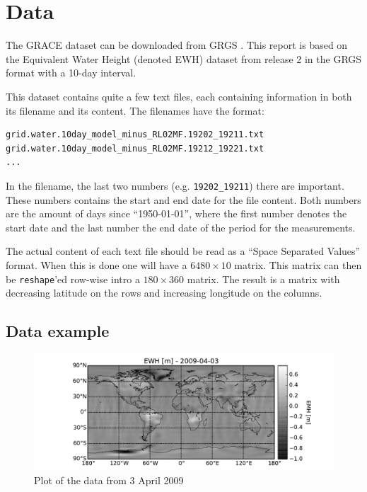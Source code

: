 \section{Data}

The GRACE dataset can be downloaded from GRGS \cite{GRACE-data-source}.
This report is based on the Equivalent Water Height (denoted EWH) dataset from release 2 in the GRGS format with a 10-day interval.

This dataset contains quite a few text files, each containing information in both its filename and its content.
The filenames have the format:

\begin{lstlisting}
grid.water.10day_model_minus_RL02MF.19202_19211.txt
grid.water.10day_model_minus_RL02MF.19212_19221.txt
...
\end{lstlisting}

In the filename, the last two numbers (e.g. \texttt{19202\_19211}) there are important.
These numbers contains the start and end date for the file content.
Both numbers are the amount of days since ``1950-01-01'', where the first number denotes the start date and the last number the end date of the period for the measurements. \cite{GRACE-data-format-dates}

The actual content of each text file should be read as a ``Space Separated Values'' format.
When this is done one will have a $6480 \times 10$ matrix. 
This matrix can then be \texttt{reshape}'ed row-wise intro a $180 \times 360$ matrix.
The result is a matrix with decreasing latitude on the rows and increasing longitude on the columns. \cite{GRACE-data-format-grids}

\subsection{Data example}

\begin{figure}[H]
	\centering
	\includegraphics[width=\textwidth]{figures/data-example-world}
	\caption{Plot of the data from 3 April 2009}
	\label{fig:data-example-world}
\end{figure}

